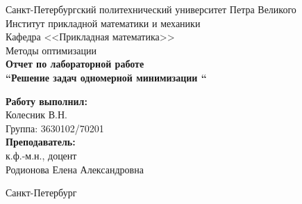 \begin{titlepage}	%

	\begin{center}		%

		\large Санкт-Петербургский политехнический университет Петра Великого\\
		\large Институт прикладной математики и механики \\
		\large Кафедра <<Прикладная математика>>\\[6cm]
		
		\huge Методы оптимизации\\[0.5cm] %
		\large \textbf{Отчет по лабораторной работе \\``Решение задач одномерной минимизации ``}\\[5.1cm]

	\end{center}


	\begin{flushright} %
		\begin{minipage}{0.25\textwidth} %
			\begin{flushleft} %

				\large\textbf{Работу выполнил:}\\
				\large Колесник В.Н.\\
				\large {Группа:} 3630102/70201\\
				
				\large \textbf{Преподаватель:}\\
				\large к.ф.-м.н., доцент\\
				\large Родионова Елена Александровна

			\end{flushleft}
		\end{minipage}
	\end{flushright}
	
	\vfill %

	\begin{center}
	\large Санкт-Петербург\\
	\large \the\year %
	\end{center} %

\end{titlepage} %

\vfill %
